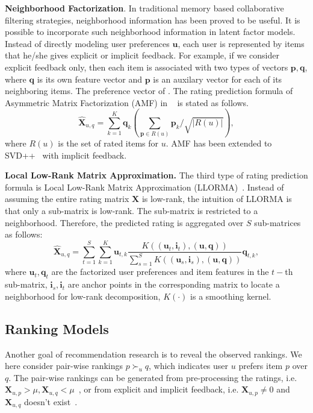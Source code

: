 \documentclass[letterpaper]{article} %
\newcommand{\Rating}{\mathbf{X}}
\begin{document}
\textbf{Neighborhood Factorization}. In traditional memory based collaborative filtering strategies, neighborhood information has been proved to be useful. It is possible  to incorporate such neighborhood information in latent factor models. Instead of directly modeling user preferences $\mathbf{u}$, each user is represented by items that he/she gives explicit or implicit feedback. For example, if we consider explicit feedback only, then each item is associated with two types of vectors $\mathbf{p},\mathbf{q}$, where $\mathbf{q}$ is its own feature vector and $\mathbf{p}$ is an auxilary vector for each of its neighboring items. The preference vector of . The rating prediction formula of Asymmetric Matrix Factorization (AMF) in ~\cite{Koren2008Factorization} is stated as follows.  
 \begin{equation}\label{equ:AMF}
\hat{\Rating}_{u,q}=\sum_{k=1}^{K} \mathbf{q}_{k} (\sum_{\mathbf{p} \in R(u)} \mathbf{p}_k/\sqrt{|R(u)|} ),
\end{equation}
where  $R(u)$ is the set of rated items for $u$. AMF has been extended to SVD++~\cite{Koren2008Factorization} with implicit feedback. 

\textbf{Local Low-Rank Matrix Approximation.} The third type of rating prediction formula is  Local Low-Rank Matrix Approximation (LLORMA)~\cite{Lee2013Local}. Instead of assuming the entire rating matrix $\Rating$ is low-rank, the intuition of LLORMA is that only a sub-matrix is low-rank. The sub-matrix is restricted to a neighborhood. Therefore, the predicted rating is aggregated over $S$ sub-matrices as follows:
\begin{equation}\label{equ:LLORMA}
\hat{\Rating}_{u,q} = \sum_{t=1}^{S} \sum_{k=1}^K \mathbf{u}_{t, k} \frac{K((\mathbf{u}_t,\mathbf{i}_t),(\mathbf{u},\mathbf{q}))}{\sum_{s=1}^{S} K((\mathbf{u}_s,\mathbf{i}_s),(\mathbf{u},\mathbf{q}))} \mathbf{q}_{t,k},
\end{equation}
where $\mathbf{u}_t, \mathbf{q}_t$ are the factorized user preferences and item features in the $t-$th sub-matrix,  $\mathbf{i}_s,\mathbf{i}_t$ are anchor points in the corresponding matrix to locate a neighborhood for low-rank decomposition, $K(\cdot)$ is a smoothing kernel. 


\subsection{Ranking Models}
Another goal of recommendation research is to reveal the observed rankings. We here consider pair-wise rankings $p\succ_u q$, which indicates user $u$ prefers item $p$ over $q$. The pair-wise rankings can be generated from pre-processing  the ratings, i.e. $\Rating_{u,p}> \mu, \Rating_{u,q}<\mu$~\cite{Hu2017Decoupled}, or from explicit and implicit feedback, i.e. $\Rating_{u,p}\neq 0$ and $ \Rating_{u,q}$ doesn't exist~\cite{Rendle2009BPR}. 
\end{document}
